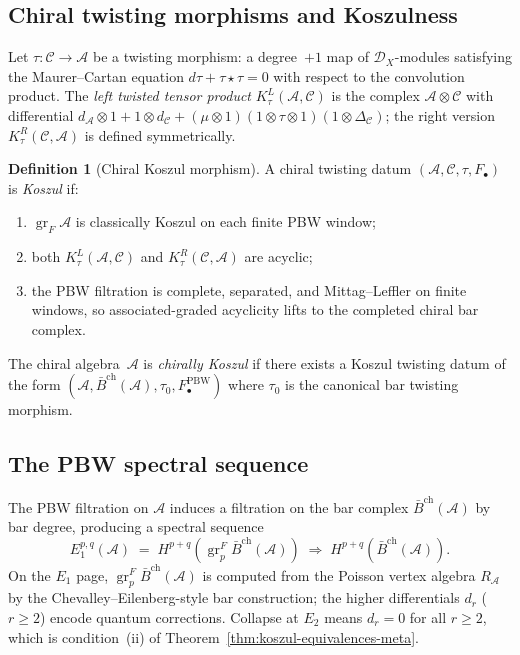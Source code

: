 \documentclass[11pt,reqno]{amsart}
\theoremstyle{definition}
\newtheorem{definition}[theorem]{Definition}
\theoremstyle{remark}
\newcommand{\cA}{\mathcal{A}}
\newcommand{\cC}{\mathcal{C}}
\newcommand{\cD}{\mathcal{D}}
\newcommand{\barBgeom}{\bar{B}^{\mathrm{ch}}}
\DeclareMathOperator{\gr}{gr}
\numberwithin{equation}{section}
\begin{document}
\subsection{Chiral twisting morphisms and Koszulness}

Let $\tau\colon \cC\to \cA$ be a twisting morphism: a degree~$+1$
map of $\cD_X$-modules satisfying the Maurer--Cartan equation
$d\tau + \tau\star\tau = 0$ with respect to the convolution
product. The \emph{left twisted tensor product}
$K_\tau^L(\cA,\cC)$ is the complex
$\cA\otimes\cC$ with differential
$d_\cA\otimes 1 + 1\otimes d_\cC + (\mu\otimes 1)(1\otimes\tau\otimes 1)
 (1\otimes \Delta_\cC)$;
the right version $K_\tau^R(\cC,\cA)$ is defined symmetrically.

\begin{definition}[Chiral Koszul morphism]
\label{def:chiral-koszul-morphism}
A chiral twisting datum $(\cA,\cC,\tau,F_\bullet)$ is
\emph{Koszul} if:
\begin{enumerate}[label=\textup{(\alph*)}]
\item $\gr_F\cA$ is classically Koszul on each finite PBW window;
\item both $K_\tau^L(\cA,\cC)$ and $K_\tau^R(\cC,\cA)$
are acyclic;
\item the PBW filtration is complete, separated, and
Mittag--Leffler on finite windows, so associated-graded
acyclicity lifts to the completed chiral bar complex.
\end{enumerate}
The chiral algebra~$\cA$ is \emph{chirally Koszul}
if there exists a Koszul twisting datum of the form
$(\cA,\barBgeom(\cA),\tau_0,F_\bullet^{\mathrm{PBW}})$ where
$\tau_0$ is the canonical bar twisting morphism.
\end{definition}

\subsection{The PBW spectral sequence}

The PBW filtration on $\cA$ induces a filtration on the bar
complex $\barBgeom(\cA)$ by bar degree, producing a spectral
sequence
\[
E_1^{p,q}(\cA) \;=\; H^{p+q}(\gr^F_p \barBgeom(\cA))
 \;\Longrightarrow\; H^{p+q}(\barBgeom(\cA)).
\]
On the $E_1$ page, $\gr^F_p\barBgeom(\cA)$ is computed from the
Poisson vertex algebra $R_\cA$ by the Chevalley--Eilenberg-style
bar construction; the higher differentials $d_r$ ($r \ge 2$)
encode quantum corrections. Collapse at $E_2$ means $d_r = 0$ for
all $r \ge 2$, which is condition~(ii) of
Theorem~\ref{thm:koszul-equivalences-meta}.
\end{document}
